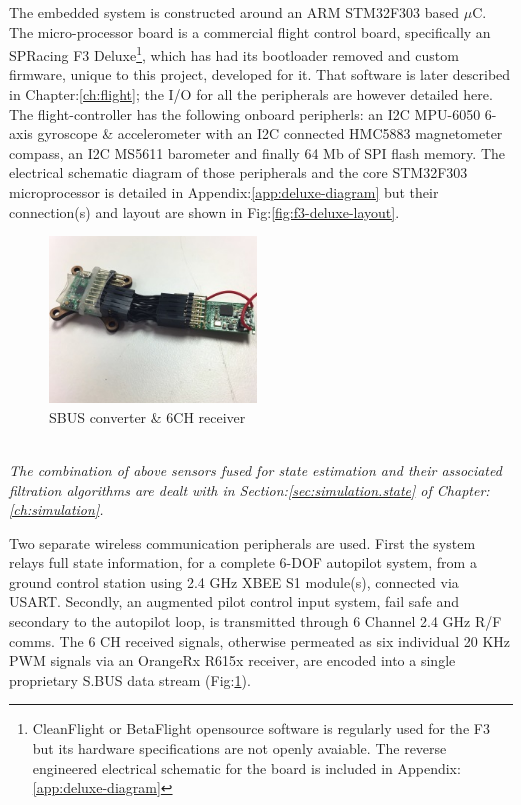 The embedded system is constructed around an ARM STM32F303\cite{stm32f303} based $\mu$C. The micro-processor board is a commercial flight control board, specifically an SPRacing F3 Deluxe\cite{spracing}\footnote{CleanFlight or BetaFlight opensource software is regularly used for the F3 but its hardware specifications are not openly avaiable. The reverse engineered electrical schematic for the board is included in Appendix:\ref{app:deluxe-diagram}}, which has had its bootloader removed and custom firmware, unique to this project, developed for it. That software is later described in Chapter:\ref{ch:flight}; the I/O for all the peripherals are however detailed here. The flight-controller has the following onboard peripherls: an I2C MPU-6050\cite{mpu6050} 6-axis gyroscope \& accelerometer with an I2C connected HMC5883\cite{hmc5883} magnetometer compass, an I2C MS5611\cite{ms5611} barometer and finally 64 Mb of SPI flash memory. The electrical schematic diagram of those peripherals and the core STM32F303 microprocessor is detailed in Appendix:\ref{app:deluxe-diagram} but their connection(s) and layout are shown in Fig:\ref{fig:f3-deluxe-layout}. 
\par
\begin{minipage}{\textwidth}
\par
\begin{figure}
\vspace{3pt}
\centering
\includegraphics[width=0.49\textwidth]{figs/ppm-sbus}
\caption{SBUS converter \& 6CH receiver}
\label{fig:ppm-sbus}
\end{figure}
\par
\emph{\color{Gray}\\ The combination of above sensors fused for state estimation and their associated filtration algorithms are dealt with in Section:\ref{sec:simulation.state} of Chapter:\ref{ch:simulation}.\\}
\par
Two separate wireless communication peripherals are used. First the system relays full state information, for a complete 6-DOF autopilot system, from a ground control station using 2.4 GHz XBEE S1 module(s)\cite{xbees1}, connected via USART. Secondly, an augmented pilot control input system, fail safe and secondary to the autopilot loop, is transmitted through 6 Channel 2.4 GHz R/F comms. The 6 CH received signals, otherwise permeated as six individual 20 KHz PWM signals via an OrangeRx R615x\cite{r615x} receiver, are encoded into a single proprietary S.BUS data stream (Fig:\ref{fig:ppm-sbus}). 
\end{minipage}
